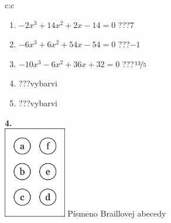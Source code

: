 \documentclass[10pt]{report}
\begin{document}
\begin{tabular}{c:c}
\begin{minipage}[c][104.5mm][t]{0.5\linewidth}
\begin{center}
\begin{minipage}{0.79\linewidth}
\begin{center}
\begin{varwidth}{\linewidth}
\begin{enumerate}
\item $-2x^3+14x^2+2x-14=0$\quad \dotfill\; ???\;\dotfill \quad $7$
\item $-6x^3+6x^2+54x-54=0$\quad \dotfill\; ???\;\dotfill \quad $-1$
\item $-10x^3-6x^2+36x+32=0$\quad \dotfill\; ???\;\dotfill \quad $\nicefrac{13}{5}$
\item \quad \dotfill\; ???\;\dotfill \quad vybarvi
\item \quad \dotfill\; ???\;\dotfill \quad vybarvi
\end{enumerate}
\end{varwidth}
\end{center}
\end{minipage}
\begin{minipage}{0.20\linewidth}
\begin{center}
{\Huge\bfseries 4.} \\[2mm]
\includegraphics[height=40mm]{../images/braille.png}
{\small Písmeno Braillovej abecedy}
\end{center}
\end{minipage}
\end{center}
\end{minipage}
%
\end{tabular}
\newpage
\end{document}
